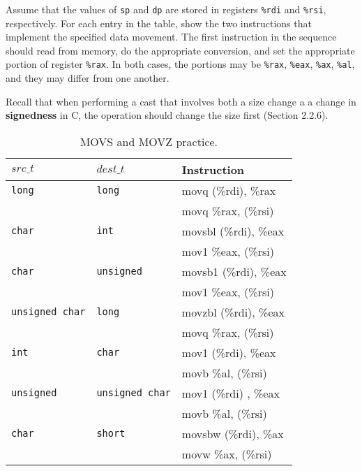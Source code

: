 \documentclass{article}
\begin{document}
Assume that the values of \texttt{sp} and \texttt{dp} are stored in registers \texttt{\%rdi} and \texttt{\%rsi}, respectively. For each entry in the table, show the two instructions that implement the specified data movement. The first instruction in the sequence should read from memory, do the appropriate conversion, and set the appropriate portion of register \texttt{\%rax}. In both cases, the portions may be \texttt{\%rax}, \texttt{\%eax}, \texttt{\%ax}, \texttt{\%al}, and they may differ from one another.

Recall that when performing a cast that involves both a size change a a change in \textbf{signedness} in C, the operation should change the size first (Section 2.2.6).

\begin{table}[h]
\centering
\begin{tabular}{|l|l|l|}
\hline
$src\_t$ & $dest\_t$ & Instruction \\ \hline
\texttt{long} & \texttt{long} & movq (\%rdi), \%rax  \\
              &               & movq \%rax, (\%rsi) \\ \hline
\texttt{char} & \texttt{int} &  movsbl (\%rdi), \%eax  \\ 
              &              &  mov1 \%eax, (\%rsi) \\ \hline
\texttt{char} & \texttt{unsigned} & movsb1 (\%rdi), \%eax \\ 
              &                   & mov1 \%eax, (\%rsi) \\ \hline
\texttt{unsigned char} & \texttt{long} & movzbl (\%rdi), \%eax \\
                       &               & movq \%rax, (\%rsi) \\ \hline
\texttt{int} & \texttt{char} & mov1 (\%rdi), \%eax \\
             &               & movb \%al, (\%rsi) \\ \hline
\texttt{unsigned} & \texttt{unsigned char} & mov1 (\%rdi) , \%eax \\
                  &                        & movb \%al, (\%rsi) \\ \hline
\texttt{char} & \texttt{short} & movsbw (\%rdi), \%ax \\
              &                 & movw \%ax, (\%rsi) \\ \hline
\hline
\end{tabular}
\caption{MOVS and MOVZ practice.}
\label{tab:prob3}
\end{table}
\end{document}
